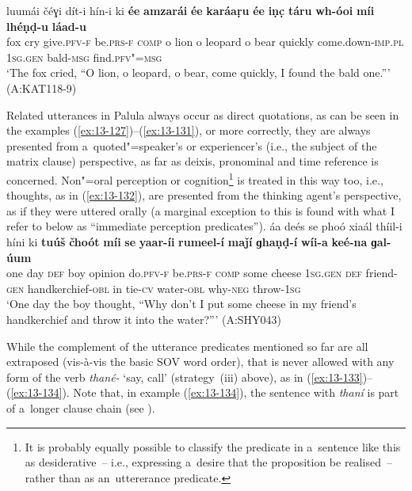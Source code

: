 \ex
\label{ex:13-131}
\gll luumái čéɣi dít-i hín-i ki \textbf{ée} \textbf{amzarái} \textbf{ée} \textbf{karáaṛu} \textbf{ée} \textbf{iṇc̣} \textbf{táru} \textbf{wh-óoi} \textbf{míi} \textbf{lhéṇḍ-u} \textbf{láad-u}\\
fox cry give.\textsc{pfv-f} be.\textsc{prs-f} \textsc{comp} o lion  o leopard o bear quickly come.down-\textsc{imp.pl} \textsc{1sg.gen} bald-\textsc{msg} find.\textsc{pfv"=msg}  \\
\glt `The fox cried, ``O lion, o leopard, o bear, come quickly, I found the bald one.''' (A:KAT118-9) 
\z

Related utterances in Palula always occur as direct quotations, as can be seen in the examples (\ref{ex:13-127})--(\ref{ex:13-131}), or more correctly, they are always presented from a~quoted"=speaker's or experiencer's (i.e., the subject of the matrix clause) perspective, as far as deixis, pronominal and time reference is concerned. Non"=oral perception or cognition\footnote{It is probably equally possible to classify the predicate in a~sentence like this as desiderative~-- i.e., expressing a~desire that the proposition be realised~-- rather than as an~uttererance predicate.} is treated in this way too, i.e., thoughts, as in (\ref{ex:13-132}), are presented from the thinking agent's perspective, as if they were uttered orally (a marginal exception to this is found with what I refer to below as ``immediate perception predicates''). 
\ea
\label{ex:13-132}
\gll áa deés se phoó xiaál thíil-i híni ki \textbf{tuúš} \textbf{čhoót} \textbf{míi} \textbf{se} \textbf{yaar-íi} \textbf{rumeel-í} \textbf{maǰí} \textbf{ɡhaṇḍ-í} \textbf{wíi-a} \textbf{keé-na} \textbf{ɡal-úum}\\
one day \textsc{def} boy opinion do.\textsc{pfv-f} be.\textsc{prs-f} \textsc{comp} some cheese \textsc{1sg.gen} \textsc{def} friend-\textsc{gen} handkerchief-\textsc{obl}  in tie-\textsc{cv} water-\textsc{obl} why-\textsc{neg} throw-\textsc{1sg}\\
\glt `One day the boy thought, ``Why don't I put some cheese in my friend's handkerchief and throw it into the water?''' (A:SHY043)
\z

While the complement of the utterance predicates mentioned so far are all extraposed (vis-à-vis the basic SOV word order), that is never allowed with any form of the verb \textit{thané-} `say, call' (strategy~(iii) above), as in (\ref{ex:13-133})--(\ref{ex:13-134}). Note that, in example (\ref{ex:13-134}), the sentence with \textit{thaní} is part of a~longer clause chain (see ).

